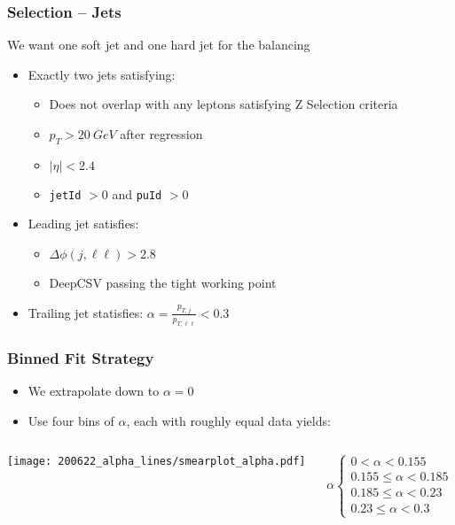 \documentclass{beamer}
\begin{document}
\begin{frame}
  \frametitle{Selection -- Jets}

  We want one soft jet and one hard jet for the balancing

  \begin{itemize}
  \item Exactly two jets satisfying:
    \begin{itemize}
    \item Does not overlap with any leptons satisfying Z Selection criteria
    \item $p_T > \SI{20}{GeV}$ after regression
    \item $|\eta| < 2.4$
    \item \texttt{jetId} $> 0$ and \texttt{puId} $> 0$
    \end{itemize}
  \item Leading jet satisfies:
    \begin{itemize}
    \item $\Delta\phi(j, \ell\ell) > 2.8$
    \item DeepCSV passing the tight working point
    \end{itemize}
  \item Trailing jet statisfies: $\alpha = \frac{p_{T, j}}{p_{T, \ell\ell}} < 0.3$
  \end{itemize}

\end{frame}


\begin{frame}
  \frametitle{Binned Fit Strategy}

  \begin{itemize}
  \item We extrapolate down to $\alpha = 0$
  \item Use four bins of $\alpha$, each with roughly equal data yields:
  \end{itemize}
  \begin{columns}
    \begin{column}{0.5\linewidth}
      \texttt{[image: 200622\_alpha\_lines/smearplot\_alpha.pdf]}
    \end{column}
    \begin{column}{0.5\linewidth}
      \[
      \alpha
      \begin{cases}
        0 < \alpha < 0.155 \\
        0.155 \le \alpha < 0.185 \\
        0.185 \le \alpha < 0.23 \\
        0.23 \le \alpha < 0.3
      \end{cases}
      \]
    \end{column}
  \end{columns}

\end{frame}
\end{document}
